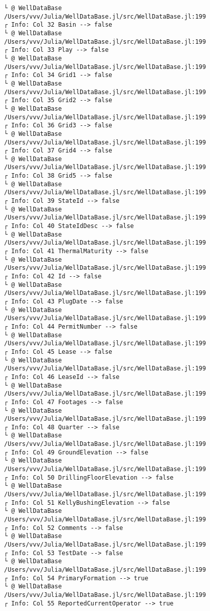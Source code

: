 \documentclass[11pt]{article}
\begin{document}
\begin{Verbatim}[commandchars=\\\{\}]
└ @ WellDataBase /Users/vvv/Julia/WellDataBase.jl/src/WellDataBase.jl:199
┌ Info: Col 32 Basin --> false
└ @ WellDataBase /Users/vvv/Julia/WellDataBase.jl/src/WellDataBase.jl:199
┌ Info: Col 33 Play --> false
└ @ WellDataBase /Users/vvv/Julia/WellDataBase.jl/src/WellDataBase.jl:199
┌ Info: Col 34 Grid1 --> false
└ @ WellDataBase /Users/vvv/Julia/WellDataBase.jl/src/WellDataBase.jl:199
┌ Info: Col 35 Grid2 --> false
└ @ WellDataBase /Users/vvv/Julia/WellDataBase.jl/src/WellDataBase.jl:199
┌ Info: Col 36 Grid3 --> false
└ @ WellDataBase /Users/vvv/Julia/WellDataBase.jl/src/WellDataBase.jl:199
┌ Info: Col 37 Grid4 --> false
└ @ WellDataBase /Users/vvv/Julia/WellDataBase.jl/src/WellDataBase.jl:199
┌ Info: Col 38 Grid5 --> false
└ @ WellDataBase /Users/vvv/Julia/WellDataBase.jl/src/WellDataBase.jl:199
┌ Info: Col 39 StateId --> false
└ @ WellDataBase /Users/vvv/Julia/WellDataBase.jl/src/WellDataBase.jl:199
┌ Info: Col 40 StateIdDesc --> false
└ @ WellDataBase /Users/vvv/Julia/WellDataBase.jl/src/WellDataBase.jl:199
┌ Info: Col 41 ThermalMaturity --> false
└ @ WellDataBase /Users/vvv/Julia/WellDataBase.jl/src/WellDataBase.jl:199
┌ Info: Col 42 Id --> false
└ @ WellDataBase /Users/vvv/Julia/WellDataBase.jl/src/WellDataBase.jl:199
┌ Info: Col 43 PlugDate --> false
└ @ WellDataBase /Users/vvv/Julia/WellDataBase.jl/src/WellDataBase.jl:199
┌ Info: Col 44 PermitNumber --> false
└ @ WellDataBase /Users/vvv/Julia/WellDataBase.jl/src/WellDataBase.jl:199
┌ Info: Col 45 Lease --> false
└ @ WellDataBase /Users/vvv/Julia/WellDataBase.jl/src/WellDataBase.jl:199
┌ Info: Col 46 LeaseId --> false
└ @ WellDataBase /Users/vvv/Julia/WellDataBase.jl/src/WellDataBase.jl:199
┌ Info: Col 47 Footages --> false
└ @ WellDataBase /Users/vvv/Julia/WellDataBase.jl/src/WellDataBase.jl:199
┌ Info: Col 48 Quarter --> false
└ @ WellDataBase /Users/vvv/Julia/WellDataBase.jl/src/WellDataBase.jl:199
┌ Info: Col 49 GroundElevation --> false
└ @ WellDataBase /Users/vvv/Julia/WellDataBase.jl/src/WellDataBase.jl:199
┌ Info: Col 50 DrillingFloorElevation --> false
└ @ WellDataBase /Users/vvv/Julia/WellDataBase.jl/src/WellDataBase.jl:199
┌ Info: Col 51 KellyBushingElevation --> false
└ @ WellDataBase /Users/vvv/Julia/WellDataBase.jl/src/WellDataBase.jl:199
┌ Info: Col 52 Comments --> false
└ @ WellDataBase /Users/vvv/Julia/WellDataBase.jl/src/WellDataBase.jl:199
┌ Info: Col 53 TestDate --> false
└ @ WellDataBase /Users/vvv/Julia/WellDataBase.jl/src/WellDataBase.jl:199
┌ Info: Col 54 PrimaryFormation --> true
└ @ WellDataBase /Users/vvv/Julia/WellDataBase.jl/src/WellDataBase.jl:199
┌ Info: Col 55 ReportedCurrentOperator --> true

\end{Verbatim}
\end{document}
